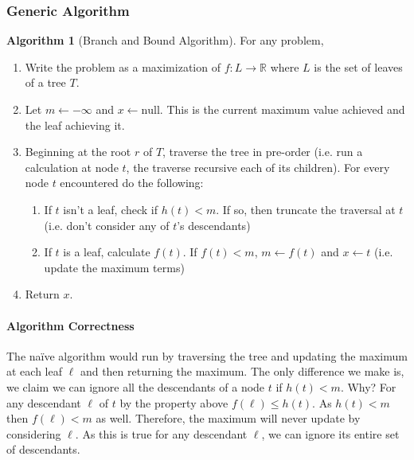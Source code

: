 \documentclass[11pt]{article}
\theoremstyle{plain}
\theoremstyle{definition}
\newtheorem{alg}[thm]{Algorithm}
\newcommand{\RR}{\mathbb{R}}
\numberwithin{equation}{section}
\numberwithin{figure}{section}
\begin{document}
\subsubsection{Generic Algorithm}
\begin{framed}
\begin{alg}[Branch and Bound Algorithm] For any problem,
\begin{enumerate}
\item Write the problem as a maximization of $f: L \rightarrow \RR$ where $L$ is the set of leaves of a tree $T$.
\item Let $m \leftarrow -\infty$ and $x \leftarrow \text{null}$. This is the current maximum value achieved and the leaf achieving it.
\item Beginning at the root $r$ of $T$, traverse the tree in pre-order (i.e. run a calculation at node $t$, the traverse recursive each of its children). For every node $t$ encountered do the following:
\begin{enumerate}
	\item If $t$ isn't a leaf, check if $h(t) < m$. If so, then truncate the traversal at $t$ (i.e. don't consider any of $t$'s descendants)
	\item If $t$ is a leaf, calculate $f(t)$. If $f(t) < m$, $m \leftarrow f(t)$ and $x \leftarrow t$ (i.e. update the maximum terms)
\end{enumerate}
\item Return $x$.
\end{enumerate}
\end{alg}
\end{framed}

\paragraph{Algorithm Correctness}
The na\"ive algorithm would run by traversing the tree and updating the maximum at each leaf $\ell$ and then returning the maximum. The only difference we make is, we claim we can ignore all the descendants of a node $t$ if $h(t) < m$. Why? For any descendant $\ell$ of $t$ by the property above $f(\ell) \leq h(t)$. As $h(t) < m$ then $f(\ell) < m$ as well. Therefore, the maximum will never update by considering $\ell$. As this is true for any descendant $\ell$, we can ignore its entire set of descendants.
\end{document}
